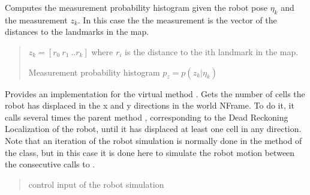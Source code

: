 \documentclass[letterpaper,10pt,english]{sphinxmanual}
\begin{document}
\begin{fulllineitems}
\begin{fulllineitems}
\label{\detokenize{GridLocalization:GL_4DOFAUV.GL_4DOFAUV.MeasurementProbability}}
\pysigstartsignatures
{}
\pysigstopsignatures
\sphinxAtStartPar
Computes the measurement probability histogram given the robot pose \(\eta_k\) and the measurement \(z_k\).
In this case the the measurement is the vector of the distances to the landmarks in the map.
\begin{quote}\begin{description}
\sphinxAtStartPar
{} \textendash{} \(z_k=[r_0~r_1~..r_k]\) where \(r_i\) is the distance to the i\sphinxhyphen{}th landmark in the map.

\sphinxAtStartPar
Measurement probability histogram \(p_z=p(z_k | \eta_k)\)

\end{description}\end{quote}

\end{fulllineitems}


\begin{fulllineitems}
\label{\detokenize{GridLocalization:GL_4DOFAUV.GL_4DOFAUV.GetInput}}
\pysigstartsignatures
{}
\pysigstopsignatures
\sphinxAtStartPar
Provides an implementation for the virtual method .
Gets the number of cells the robot has displaced in the x and y directions in the world N\sphinxhyphen{}Frame. To do it, it
calls several times the parent method , corresponding to the Dead Reckoning Localization
of the robot, until it has displaced at least one cell in any direction.
Note that an iteration of the robot simulation  is normally done in the 
method of the  class, but in this case it is done here to simulate the robot motion
between the consecutive calls to .
\begin{quote}\begin{description}
\sphinxAtStartPar
{} \textendash{} control input of the robot simulation


\end{description}
\end{quote}
\end{fulllineitems}
\end{fulllineitems}
\end{document}
